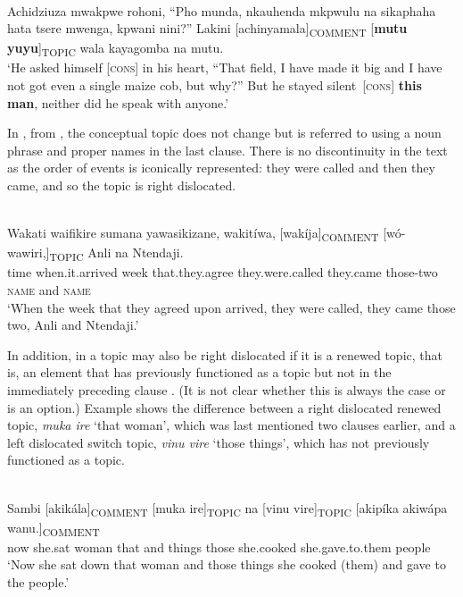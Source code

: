 \documentclass[output=paper]{langsci/langscibook}
\begin{document}
\ea\label{ex:11.nicolle}
\\
  Achidziuza mwakpwe rohoni, “Pho munda, nkauhenda mkpwulu na sikaphaha hata tsere mwenga, kpwani nini?” Lakini [achinyamala]\textsubscript{COMMENT} [\textbf{mutu yuyu}]\textsubscript{TOPIC} wala kayagomba na mutu.\\ 
\glt ‘He asked himself [\textsc{cons}] in his heart, “That field, I have made it big and I have not got even a single maize cob, but why?” But he stayed silent~[\textsc{cons}] \textbf{this man}, neither did he speak with anyone.’
\z

In , from , the conceptual topic does not change but is referred to using a noun phrase and proper names in the last clause. There is no discontinuity in the text as the order of events is iconically represented: they were called and then they came, and so the topic is right dislocated.

\ea\label{ex:12.nicolle}
\\
\gll Wakati waifikire sumana yawasikizane, wakitíwa, [wakíja]\textsubscript{COMMENT} [wó-wawiri,]\textsubscript{TOPIC} Anli na Ntendaji.\\
time when.it.arrived week that.they.agree they.were.called {\db}they.came {\db}those-two \textsc{name} and \textsc{name}\\
\glt ‘When the week that they agreed upon arrived, they were called, they came those two, Anli and Ntendaji.’
\z

In addition, in  a topic may also be right dislocated if it is a renewed topic, that is, an element that has previously functioned as a topic but not in the immediately preceding clause \citep[10-11]{floor2005}. (It is not clear whether this is always the case or is an option.) Example  shows the difference between a right dislocated renewed topic, \textit{muk}\textit{a ire} ‘that woman’, which was last mentioned two clauses earlier, and a left dislocated switch topic, \textit{vinu vire} ‘those things’, which has not previously functioned as a topic.

\ea\label{ex:13.nicolle}
\\
\gll Sambi [akikála]\textsubscript{COMMENT} [muka ire]\textsubscript{TOPIC} na [vinu vire]\textsubscript{TOPIC} [akipíka akiwápa wanu.]\textsubscript{COMMENT}\\
now {\db}she.sat {\db}woman that and {\db}things those {\db}she.cooked she.gave.to.them people\\
\glt ‘Now she sat down that woman and those things she cooked (them) and gave to the people.’
\z
\end{document}
